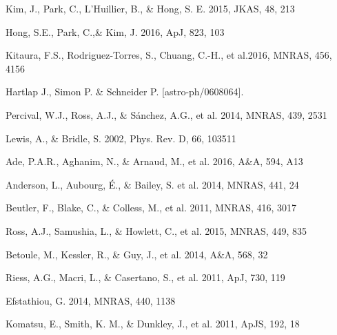 \documentclass[prl,twocolumn,superscriptaddress,aps,amsmath,amssymb,nofootinbib,altaffilletter]{revtex4}
\begin{document}
\begin{thebibliography}{}
Kim, J., Park, C., L'Huillier, B., \& Hong, S. E. 2015, JKAS, 48, 213

Hong, S.E., Park, C.,\&  Kim, J. 2016, ApJ, 823, 103

Kitaura, F.S., Rodriguez-Torres, S., Chuang, C.-H., et al.2016, MNRAS, 456, 4156

Hartlap J., Simon P. \& Schneider P. [astro-ph/0608064].

Percival, W.J., Ross, A.J., \& S\'{a}nchez, A.G., et al. 2014, MNRAS, 439, 2531

Lewis, A., \& Bridle, S. 2002, Phys. Rev. D, 66, 103511

Ade, P.A.R., Aghanim, N., \& Arnaud, M., et al. 2016, A\&A, 594, A13 

Anderson, L., Aubourg, \'E., \& Bailey, S. et al. 2014, MNRAS, 441, 24 

Beutler, F., Blake, C., \& Colless, M., et al. 2011, MNRAS, 416, 3017

Ross, A.J., Samushia, L., \& Howlett, C., et al. 2015, MNRAS, 449, 835

Betoule, M., Kessler, R., \& Guy, J., et al. 2014, A\&A, 568, 32

Riess, A.G., Macri, L., \& Casertano, S., et al. 2011, ApJ, 730, 119

Efstathiou, G. 2014, MNRAS, 440, 1138








Komatsu, E., Smith, K. M., \& Dunkley, J., et al. 2011, ApJS, 192, 18  



\end{thebibliography}
\end{document}
